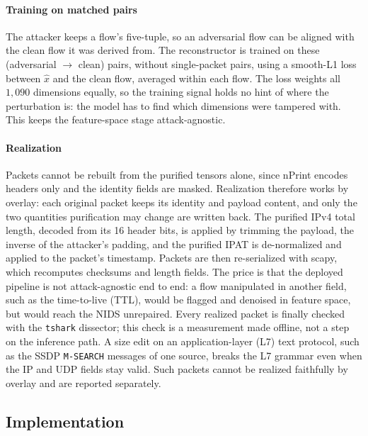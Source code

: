 \documentclass[acmtog,nonacm,pbalance]{acmart}
\begin{document}
\paragraph{Training on matched pairs} The attacker keeps a flow's five-tuple, so an
adversarial flow can be aligned with the clean flow it was derived from.
The reconstructor is trained on these (adversarial $\rightarrow$ clean) pairs,
without single-packet pairs, using a smooth-L1 loss
between $\hat{x}$ and the clean flow, averaged within each flow. The loss
weights all $1{,}090$ dimensions equally, so the training signal holds no hint
of where the perturbation is: the model has to find which dimensions were
tampered with. This keeps the feature-space stage attack-agnostic.

\paragraph{Realization} Packets cannot be rebuilt from the purified tensors
alone, since nPrint encodes headers only and the identity fields are masked.
Realization therefore works by overlay: each original packet keeps its identity
and payload content, and only the two quantities purification may change are
written back. The purified IPv4 total length, decoded from its 16 header bits,
is applied by trimming the payload, the inverse of the attacker's padding, and the
purified IPAT is de-normalized and applied to the packet's timestamp. Packets are
then re-serialized with scapy, which recomputes checksums and length fields. The
price is that the deployed pipeline is not attack-agnostic end to end: a flow
manipulated in another field, such as the time-to-live (TTL), would be flagged and denoised in
feature space, but would reach the NIDS unrepaired. Every realized packet is
finally checked with the \texttt{tshark} dissector; this check is a measurement
made offline, not a step on the inference path. A size edit on an
application-layer (L7) text protocol, such as the SSDP \texttt{M-SEARCH} messages
of one source, breaks the L7 grammar even when the IP and UDP fields stay valid.
Such packets cannot be realized faithfully by overlay and are reported
separately.

\subsection{Implementation}\label{sec:impl}
\end{document}

